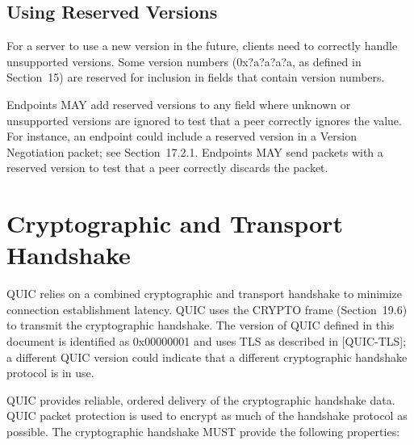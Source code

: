 \documentclass{article}
\begin{document}
\subsection{Using Reserved Versions}

For a server to use a new version in the future, clients need to correctly handle unsupported versions.  Some version numbers (0x?a?a?a?a, as defined in Section~15) are reserved for inclusion in fields that contain version numbers.

Endpoints MAY add reserved versions to any field where unknown or unsupported versions are ignored to test that a peer correctly ignores the value.  For instance, an endpoint could include a reserved version in a Version Negotiation packet; see Section~17.2.1. Endpoints MAY send packets with a reserved version to test that a peer correctly discards the packet.

\section{Cryptographic and Transport Handshake}

QUIC relies on a combined cryptographic and transport handshake to minimize connection establishment latency.  QUIC uses the CRYPTO frame (Section~19.6) to transmit the cryptographic handshake.  The version of QUIC defined in this document is identified as 0x00000001 and uses TLS as described in [QUIC-TLS]; a different QUIC version could indicate that a different cryptographic handshake protocol is in use.

QUIC provides reliable, ordered delivery of the cryptographic handshake data.  QUIC packet protection is used to encrypt as much of the handshake protocol as possible.  The cryptographic handshake MUST provide the following properties:
\end{document}
